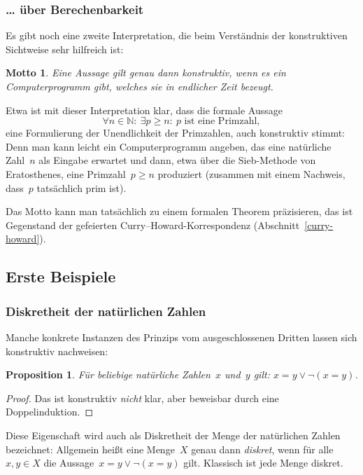 \documentclass[a4paper,ngerman,12pt]{scrartcl}
\theoremstyle{definition}
\theoremstyle{plain}
\newtheorem{prop}[defn]{Proposition}
\newtheorem{motto}[defn]{Motto}
\theoremstyle{remark}
\newcommand{\NN}{\mathbb{N}}
\renewcommand{\_}{\mathpunct{.}\,}
\newcommand{\?}{\,{:}\,}
\begin{document}
\subsubsection*{\ldots{} über Berechenbarkeit}

Es gibt noch eine zweite Interpretation, die beim Verständnis der konstruktiven
Sichtweise sehr hilfreich ist:
\begin{motto}Eine Aussage gilt genau dann konstruktiv, wenn es ein
Computerprogramm gibt, welches sie in endlicher Zeit bezeugt.\end{motto}
Etwa ist mit dieser Interpretation klar, dass die formale Aussage
\[ \forall n \in \NN{:}\ \exists p \geq n{:}\ \text{$p$ ist eine Primzahl}, \]
eine Formulierung der Unendlichkeit der Primzahlen, auch konstruktiv
stimmt: Denn man kann leicht ein Computerprogramm angeben, das eine natürliche
Zahl~$n$ als Eingabe erwartet und dann, etwa über die Sieb-Methode von
Eratosthenes, eine Primzahl~$p \geq n$ produziert (zusammen mit einem Nachweis,
dass~$p$ tatsächlich prim ist).

Das Motto kann man tatsächlich zu einem formalen Theorem
präzisieren, das ist Gegenstand der gefeierten
Curry--Howard-Korrespondenz (Abschnitt~\ref{curry-howard}).


\subsection{Erste Beispiele}

\subsubsection*{Diskretheit der natürlichen Zahlen}

Manche konkrete Instanzen des Prinzips vom ausgeschlossenen Dritten lassen sich
konstruktiv nachweisen:

\begin{prop}\label{natdiskret}Für beliebige natürliche Zahlen~$x$ und~$y$
gilt: $x = y \vee \neg(x = y)$.\end{prop}
\begin{proof}Das ist konstruktiv \emph{nicht} klar, aber beweisbar durch eine
Doppelinduktion.\end{proof}

Diese Eigenschaft wird auch als Diskretheit der Menge der natürlichen Zahlen
bezeichnet: Allgemein heißt eine Menge~$X$ genau dann \emph{diskret}, wenn für
alle~$x,y \in X$ die Aussage~$x = y \vee \neg(x = y)$ gilt. Klassisch ist jede
Menge diskret.
\end{document}
